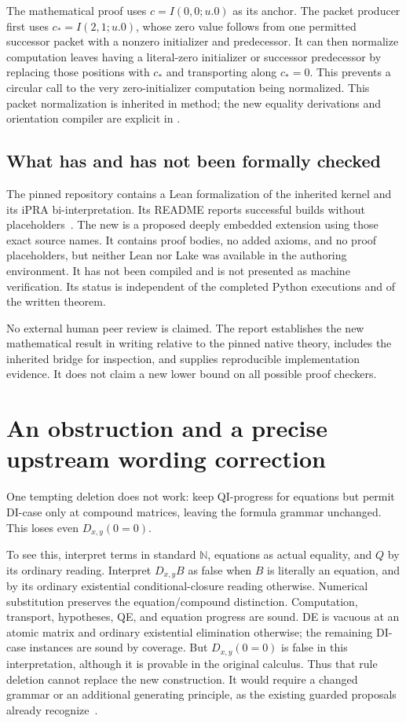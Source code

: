 The mathematical proof uses $c=I(0,0;u.0)$ as its anchor. The packet
producer first uses $c_*=I(2,1;u.0)$, whose zero value follows from one
permitted successor packet with a nonzero initializer and predecessor.
It can then normalize computation leaves having a literal-zero
initializer or successor predecessor by replacing those positions with
$c_*$ and transporting along $c_*=0$. This prevents a circular call to
the very zero-initializer computation being normalized. This packet
normalization is inherited in method; the new equality derivations and
orientation compiler are explicit in .

\subsection{What has and has not been formally checked}

The pinned repository contains a Lean formalization of the inherited
kernel and its iPRA bi-interpretation. Its README reports successful
builds without placeholders~\cite{baseline,leanbridge}. The new
 is a proposed deeply embedded
extension using those exact source names. It contains proof bodies,
no added axioms, and no proof placeholders, but neither Lean nor Lake
was available in the authoring environment. It has not been compiled
and is not presented as machine verification. Its status is independent
of the completed Python executions and of the written theorem.

No external human peer review is claimed. The report establishes the
new mathematical result in writing relative to the pinned native
theory, includes the inherited bridge for inspection, and supplies
reproducible implementation evidence. It does not claim a new lower
bound on all possible proof checkers.

\section{An obstruction and a precise upstream wording correction}
\label{sec:limits}

One tempting deletion does not work: keep QI-progress for equations
but permit DI-case only at compound matrices, leaving the formula
grammar unchanged. This loses even $D_{x,y}(0=0)$.

To see this, interpret terms in standard $\mathbb N$, equations as
actual equality, and $Q$ by its ordinary reading. Interpret $D_{x,y}B$
as false when $B$ is literally an equation, and by its ordinary
existential conditional-closure reading otherwise. Numerical
substitution preserves the equation/compound distinction. Computation,
transport, hypotheses, QE, and equation progress are sound. DE is
vacuous at an atomic matrix and ordinary existential elimination
otherwise; the remaining DI-case instances are sound by coverage.
But $D_{x,y}(0=0)$ is false in this interpretation, although it is
provable in the original calculus. Thus that rule deletion cannot
replace the new construction. It would require a changed grammar or
an additional generating principle, as the existing guarded proposals
already recognize~\cite{guarded}.


